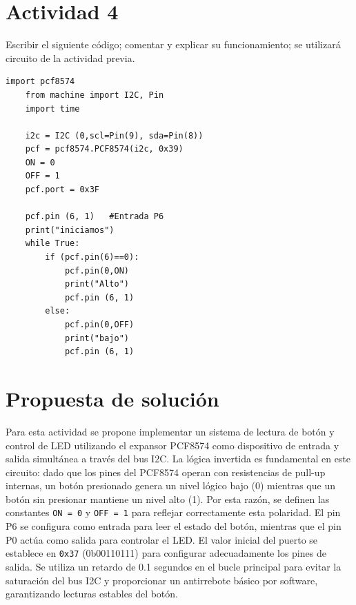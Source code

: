 \documentclass[letterpaper,12pt]{article}
\begin{document}
    \newpage

    \section*{Actividad 4}

    \noindent Escribir el siguiente código; comentar y explicar su funcionamiento; se utilizará circuito de la actividad previa.

    \begin{lstlisting}[basicstyle=\ttfamily\footnotesize,caption={Figura 10-11. Código; actividad 4}]
    import pcf8574
    from machine import I2C, Pin
    import time

    i2c = I2C (0,scl=Pin(9), sda=Pin(8))
    pcf = pcf8574.PCF8574(i2c, 0x39)
    ON = 0
    OFF = 1
    pcf.port = 0x3F

    pcf.pin (6, 1)   #Entrada P6
    print("iniciamos")
    while True:
        if (pcf.pin(6)==0):
            pcf.pin(0,ON)
            print("Alto")
            pcf.pin (6, 1)
        else:
            pcf.pin(0,OFF)
            print("bajo")
            pcf.pin (6, 1)
    \end{lstlisting}
    
    \section*{Propuesta de solución}

    Para esta actividad se propone implementar un sistema de lectura de botón y control de LED utilizando el expansor PCF8574 como dispositivo de entrada y salida simultánea a través del bus I2C. La lógica invertida es fundamental en este circuito: dado que los pines del PCF8574 operan con resistencias de pull-up internas, un botón presionado genera un nivel lógico bajo (0) mientras que un botón sin presionar mantiene un nivel alto (1). Por esta razón, se definen las constantes \texttt{ON = 0} y \texttt{OFF = 1} para reflejar correctamente esta polaridad. El pin P6 se configura como entrada para leer el estado del botón, mientras que el pin P0 actúa como salida para controlar el LED. El valor inicial del puerto se establece en \texttt{0x37} (0b00110111) para configurar adecuadamente los pines de salida. Se utiliza un retardo de 0.1 segundos en el bucle principal para evitar la saturación del bus I2C y proporcionar un antirrebote básico por software, garantizando lecturas estables del botón.
\end{document}
